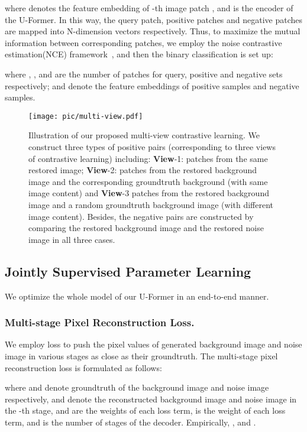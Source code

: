 where  denotes the feature embedding of -th image patch , and  is the encoder of the U-Former. In this way, the query patch, positive patches and negative patches are mapped into N-dimension vectors respectively. Thus, to maximize the mutual information between corresponding patches, we employ the noise contrastive estimation(NCE) framework~\cite{oord2018representation,park2020contrastive}, and then the binary classification is set up:
\begin{small}

\end{small}
where , , and  are the number of patches for query, positive and negative sets respectively;  and  denote the feature embeddings of positive samples and negative samples.
\begin{figure}[!tp]
    \centering
    \begin{minipage}[b]{0.95\linewidth}
    \texttt{[image: pic/multi-view.pdf]}\vspace{4pt}
    \end{minipage}
\caption{Illustration of our proposed multi-view contrastive learning. We construct three types of positive pairs (corresponding to three views of contrastive learning) including: \textbf{View}-1: patches from the same restored image; \textbf{View}-2: patches from the restored background image and the corresponding groundtruth background (with same image content) and \textbf{View}-3 patches from  the restored background image and a random groundtruth background image (with different image content). Besides, the negative pairs are constructed by comparing the restored background image and the restored noise image in all three cases.}
    \label{fig_add:multi-view}
    \vspace{-10pt}
\end{figure}
\subsection{Jointly Supervised Parameter Learning}
We optimize the whole model of our U-Former in an end-to-end manner. 

\subsubsection{Multi-stage Pixel Reconstruction Loss.} We employ  loss to push the pixel values of generated background image  and noise image  in various stages as close as their groundtruth. The multi-stage pixel reconstruction loss is formulated as follows:
\begin{small}

\end{small}
where  and  denote groundtruth of the background image and noise image respectively,  and  denote the reconstructed background image and noise image in the -th stage,  and  are the weights of each loss term,  is the weight of each  loss term, and  is the number of stages of the decoder. Empirically, ,  and .


